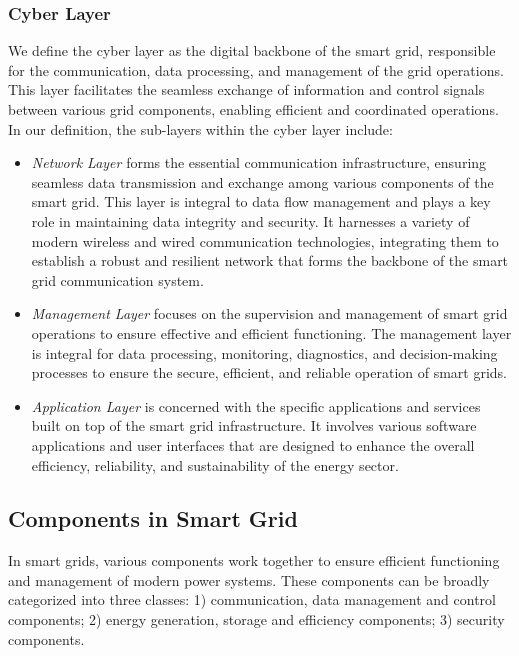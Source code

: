 \documentclass[10pt, journal]{IEEEtran}
\begin{document}
\subsubsection{Cyber Layer} 

We define the cyber layer as the digital backbone of the smart grid, responsible for the communication, data processing, and management of the grid operations. This layer facilitates the seamless exchange of information and control signals between various grid components, enabling efficient and coordinated operations. In our definition, the sub-layers within the cyber layer include:

\begin{itemize}

\item{\it Network Layer} forms the essential communication infrastructure, ensuring seamless data transmission and exchange among various components of the smart grid. This layer is integral to data flow management and plays a key role in maintaining data integrity and security. It harnesses a variety of modern wireless and wired communication technologies, integrating them to establish a robust and resilient network that forms the backbone of the smart grid communication system. 
			
\item {\it Management Layer} focuses on the supervision and management of smart grid operations to ensure effective and efficient functioning. The management layer is integral for data processing, monitoring, diagnostics, and decision-making processes to ensure the secure, efficient, and reliable operation of smart grids. 

\item {\it Application Layer} is concerned with the specific applications and services built on top of the smart grid infrastructure. It involves various software applications and user interfaces that are designed to enhance the overall efficiency, reliability, and sustainability of the energy sector.

\end{itemize}

\subsection{Components in Smart Grid}		

In smart grids, various components work together to ensure efficient functioning and management of modern power systems. These components can be broadly categorized into three classes: 1) communication, data management and control components; 2) energy generation, storage and efficiency components; 3) security components.
\end{document}
